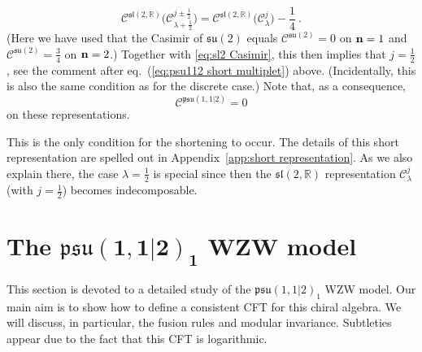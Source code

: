 \documentclass[12pt,a4paper]{article}
\newcommand{\be}{\begin{equation}}
\newcommand{\ee}{\end{equation}}
\begin{document}
\be
\mathcal{C}^{\mathfrak{sl}(2,\mathds{R})} \bigl( \mathscr{C}^{j\pm \frac{1}{2}}_{\lambda+\frac{1}{2}}\bigr)  = \mathcal{C}^{\mathfrak{sl}(2,\mathds{R})} \bigl(\mathscr{C}^{j}_{\lambda}\bigr) - \frac{1}{4} \ . 
\ee
(Here we have used that the Casimir of $\mathfrak{su}(2)$ equals $\mathcal{C}^{\mathfrak{su}(2)} = 0$ on ${\bf n}=1$ and  $\mathcal{C}^{\mathfrak{su}(2)} = \frac{3}{4}$ on ${\bf n}=2$.) Together with \eqref{eq:sl2 Casimir}, this then implies that $j=\tfrac{1}{2}$, see the comment after eq.~(\ref{eq:psu112 short multiplet}) above. (Incidentally, this is also the same condition as for the discrete case.) Note that, as a consequence, 
\be 
\mathcal{C}^{\mathfrak{psu}(1,1|2)}=0 \label{eq:psu112 Casimir vanishing}
\ee
on these representations. 

This is the only condition  for the shortening to occur. The details of this short representation are spelled out in Appendix~\ref{app:short representation}. As we also explain there, the case $\lambda=\frac{1}{2}$ is special since then the $\mathfrak{sl}(2,\mathds{R})$ representation $\mathscr{C}^{j}_\lambda$ (with $j=\frac{1}{2}$) becomes indecomposable.


\section{The $\boldsymbol{\mathfrak{psu}(1,1|2)_1}$ WZW model} \label{sec:psu112 wzw model}
This section is devoted to a detailed study of the $\mathfrak{psu}(1,1|2)_1$ WZW model. Our main aim is to show how to define a consistent CFT for this chiral algebra. We will discuss, in particular, the fusion rules and modular invariance. Subtleties appear due to the fact that this CFT is logarithmic.
\end{document}
